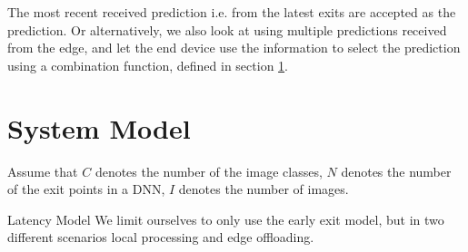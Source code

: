 The most recent received prediction i.e. from the latest exits are accepted as the prediction. Or alternatively, we also look at using multiple predictions received from the edge, and let the end device use the information to select the prediction using a combination function, defined in section \ref{sec:edge-system-model}.

\section{System Model} \label{sec:edge-system-model}

	
	Assume that $ C $ denotes the number of the image classes, $ N $ denotes the number of the exit points in a DNN, $ I $ denotes the number of images.
	\begin{enumdescript}
		\item[Latency Model] We limit ourselves to only use the early exit model, but in two different scenarios local processing and edge offloading.  %
		

\end{enumdescript}
